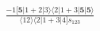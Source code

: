 \documentclass[varwidth, border=5pt]{standalone}
\begin{document}
\begin{my}
$\begin{gathered}
\scriptscriptstyle\frac{-1[𝟓|1+2|3⟩⟨2|1+3|𝟓|𝟓⟩}{⟨12⟩⟨2|1+3|4]s_{123}}
\end{gathered}$
\end{my}
\end{document}
